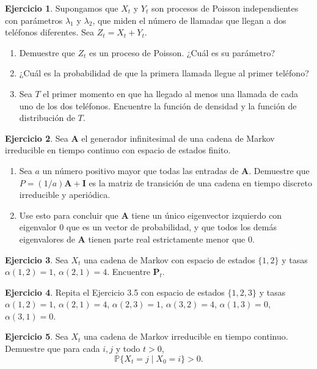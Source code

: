 \documentclass{article}
\theoremstyle{plain}
\theoremstyle{definition}
\newtheorem{Ejercicio}{Ejercicio}[section]
\newcommand{\Prob}{\mathbb{P}}
\newcommand{\A}{\mathbf{A}}
\newcommand{\I}{\mathbf{I}}
\newcommand{\PP}{\mathbf{P}}
\begin{document}
\begin{Ejercicio}
  Supongamos que $X_t$ y $Y_t$ son procesos de Poisson independientes con par\'ametros $\lambda_1$ y $\lambda_2$, que miden el n\'umero de llamadas que llegan a dos tel\'efonos diferentes. Sea $Z_t = X_t + Y_t$.
  \begin{enumerate}
    \item Demuestre que $Z_t$ es un proceso de Poisson. ¿Cu\'al es su par\'ametro?
    \item ¿Cu\'al es la probabilidad de que la primera llamada llegue al primer tel\'efono?
    \item Sea $T$ el primer momento en que ha llegado al menos una llamada de cada uno de los dos tel\'efonos. Encuentre la funci\'on de densidad y la funci\'on de distribuci\'on de $T$.
  \end{enumerate}
\end{Ejercicio}

\begin{Ejercicio}
  Sea $\A$ el generador infinitesimal de una cadena de Markov irreducible en tiempo continuo con espacio de estados finito.
  \begin{enumerate}
    \item Sea $a$ un n\'umero positivo mayor que todas las entradas de $\A$. Demuestre que $P = (1/a)\A + \I$ es la matriz de transici\'on de una cadena en tiempo discreto irreducible y aperi\'odica.
    \item Use esto para concluir que $\A$ tiene un \'unico eigenvector izquierdo con eigenvalor 0 que es un vector de probabilidad, y que todos los dem\'as eigenvalores de $\A$ tienen parte real estrictamente menor que 0.
  \end{enumerate}
\end{Ejercicio}

\begin{Ejercicio}
  Sea $X_t$ una cadena de Markov con espacio de estados $\{1,2\}$ y tasas $\alpha(1,2) = 1$, $\alpha(2,1) = 4$. Encuentre $\PP_t$.
\end{Ejercicio}

\begin{Ejercicio}
  Repita el Ejercicio 3.5 con espacio de estados $\{1,2,3\}$ y tasas $\alpha(1,2) = 1$, $\alpha(2,1) = 4$, $\alpha(2,3) = 1$, $\alpha(3,2) = 4$, $\alpha(1,3) = 0$, $\alpha(3,1) = 0$.
\end{Ejercicio}

\begin{Ejercicio}
  Sea $X_t$ una cadena de Markov irreducible en tiempo continuo. Demuestre que para cada $i, j$ y todo $t > 0$,
  \[ \Prob\{X_t = j \mid X_0 = i\} > 0. \]
\end{Ejercicio}
\end{document}
